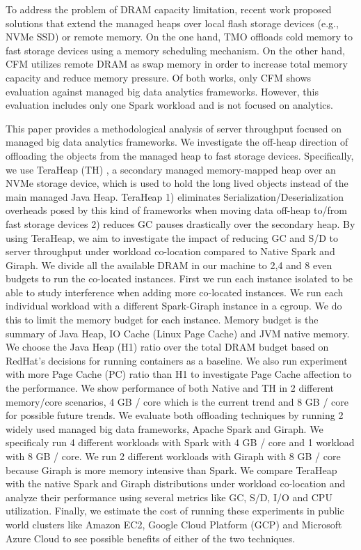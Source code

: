 To address the problem of DRAM capacity limitation, recent work
proposed solutions that extend the managed heaps over local flash
storage devices (e.g., NVMe SSD) or remote memory. On the one hand,
TMO \cite{TMO} offloads cold memory to fast storage devices using
a memory scheduling mechanism. On the other hand, CFM \cite{CFM}
utilizes remote DRAM as swap memory in order to increase total memory capacity
and reduce memory pressure. Of both works, only CFM shows
evaluation against managed big data analytics frameworks. However, this evaluation
includes only one Spark workload and is not focused on analytics.

This paper provides a methodological analysis of server throughput 
focused on managed big data analytics frameworks.
We investigate the off-heap direction of offloading the objects from the
managed heap to fast storage devices.
Specifically, we use TeraHeap (TH) \cite{TeraHeap}, a secondary managed
memory-mapped heap over an NVMe storage device, which is used to hold
the long lived objects instead of the main managed Java Heap. TeraHeap
1) eliminates Serialization/Deserialization overheads posed by this
kind of frameworks when moving data off-heap to/from fast storage
devices 2) reduces GC pauses drastically over the secondary heap. By
using TeraHeap, we aim to investigate the impact of reducing GC and S/D
to server throughput under workload co-location compared to Native Spark
and Giraph. We divide all the available DRAM
in our machine to 2,4 and 8 even budgets to run the co-located instances.
First we run each instance isolated to be able to study interference when adding more
co-located instances. We run each individual workload with a different Spark-Giraph instance in a cgroup.
We do this to limit the memory budget for each instance. Memory budget is
the summary of Java Heap, IO Cache (Linux Page Cache) and JVM native memory. We choose
the Java Heap (H1) ratio over the total DRAM budget based on RedHat's decisions
for running containers as a baseline. We also run experiment with more Page Cache (PC) ratio than H1
to investigate Page Cache affection to the performance. We show performance of both Native and TH in 2 different
memory/core scenarios, 4 GB / core which is the current trend and 8 GB / core 
for possible future trends. We evaluate both offloading techniques by running 2 widely used
managed big data frameworks, Apache Spark and Giraph. We
specificaly run 4 different workloads with Spark with 4 GB / core and 1 workload with 8 GB / core.
We run 2 different workloads with Giraph with 8 GB / core because Giraph is more memory intensive than Spark.
We compare TeraHeap with the native Spark and Giraph distributions under workload
co-location and analyze their performance using several metrics like
GC, S/D, I/O and CPU utilization. Finally, we estimate the cost of running these
experiments in public world clusters like Amazon EC2, Google Cloud Platform (GCP)
and Microsoft Azure Cloud to see possible benefits of either of the two techniques.

